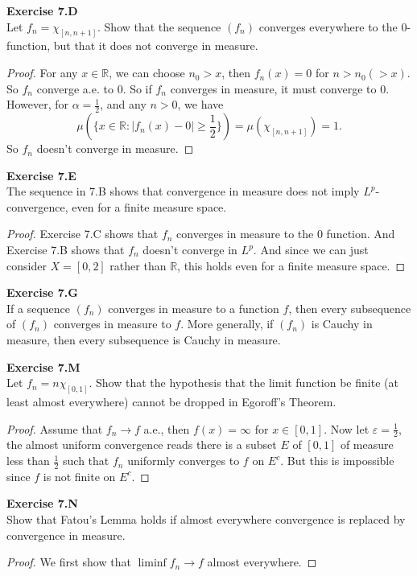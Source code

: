 \documentclass[12pt, a4paper]{article}
\theoremstyle{plain}
\newcommand{\R}{\mathbb{R}}
\def\epsilon{\varepsilon}
\newenvironment{exercise}[2][Exercise]
    { \begin{mdframed}[backgroundcolor=gray!20] \textbf{#1 #2} \\}
    {  \end{mdframed}}
\begin{document}
\begin{exercise}{7.D}
    Let $f_n=\chi_{[n,n+1]}$. Show that the sequence $(f_n)$ converges everywhere to the $0$-function, but that it does not converge in measure.
\end{exercise}
    \begin{proof}
    For any $x\in \R$, we can choose $n_0>x$, then $f_n(x) = 0$ for $n>n_0(>x)$. So $f_n$ converge a.e. to $0$. So if $f_n$ converges in measure, it must converge to $0$. However, for $\alpha=\frac{1}{2}$, and any $n>0$, we have
    \[
    \mu(\{x\in \R: |f_n(x)-0| \geq \frac{1}{2}\})=\mu(\chi_{[n,n+1]})=1.
    \]
    So $f_n$ doesn't converge in measure.
    \end{proof}

\begin{exercise}{7.E}
    The sequence in 7.B shows that convergence in measure does not imply $L^p$-convergence, even for a finite measure space.
\end{exercise}
    \begin{proof}
        Exercise 7.C shows that $f_n$ converges in measure to the $0$ function. And Exercise 7.B shows that $f_n$ doesn't converge in $L^p$. And since we can just consider $X=[0,2]$ rather than $\R$, this holds even for a finite measure space.
    \end{proof}

\begin{exercise}{7.G}
    If a sequence $(f_n)$ converges in measure to a function $f$, then every subsequence of $(f_n)$ converges in measure to $f$. More generally, if $(f_n)$ is Cauchy in measure, then every subsequence is Cauchy in measure.
\end{exercise}

\begin{exercise}{7.M}
    Let $f_n=n\chi_{[0,1]}$. Show that the hypothesis that the limit function be finite (at least almost everywhere) cannot be dropped in Egoroff's Theorem.
\end{exercise}
    \begin{proof}
        Assume that $f_n\to f$ a.e., then $f(x)=\infty$ for $x\in [0,1]$. Now let $\epsilon = \frac{1}{2}$, the almost uniform convergence reads there is a subset $E$ of $[0,1]$ of measure less than $\frac{1}{2}$ such that $f_n$ uniformly converges to $f$ on $E^c$. But this is impossible since $f$ is not finite on $E^c$.
    \end{proof}

\begin{exercise}{7.N}
    Show that Fatou's Lemma holds if almost everywhere convergence is replaced by convergence in measure.
\end{exercise}
    \begin{proof}
        We first show that $\liminf f_n\to f$ almost everywhere.
    \end{proof}
\end{document}
